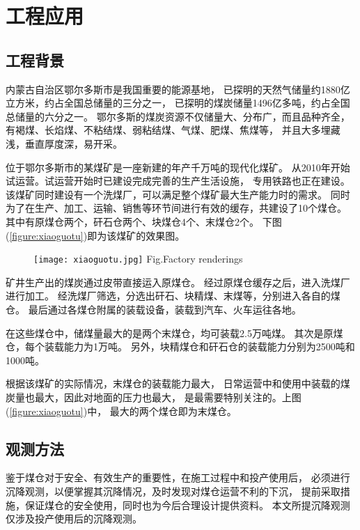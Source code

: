 
\chapter{工程应用}

\label{chap04}

\section{工程背景} 
内蒙古自治区鄂尔多斯市是我国重要的能源基地，
已探明的天然气储量约1880亿立方米，约占全国总储量的三分之一，
已探明的煤炭储量1496亿多吨，约占全国总储量的六分之一。
鄂尔多斯的煤炭资源不仅储量大、分布广，而且品种齐全，
有褐煤、长焰煤、不粘结煤、弱粘结煤、气煤、肥煤、焦煤等，
并且大多埋藏浅，垂直厚度深，易开采。

位于鄂尔多斯市的某煤矿是一座新建的年产千万吨的现代化煤矿。
从2010年开始试运营。试运营开始时已建设完成完善的生产生活设施，
专用铁路也正在建设。
该煤矿同时建设有一个洗煤厂，可以满足整个煤矿最大生产能力时的需求。
同时为了在生产、加工、运输、销售等环节间进行有效的缓存，共建设了10个煤仓。
其中有原煤仓两个，矸石仓两个、块煤仓4个、末煤仓2个。
下图(\ref{figure:xiaoguotu})即为该煤矿的效果图。
\begin{figure}[!htbp]
   \centering
   \texttt{[image: xiaoguotu.jpg]}
								{Fig.}{Factory renderings}
\end{figure}

矿井生产出的煤炭通过皮带直接运入原煤仓。
经过原煤仓缓存之后，进入洗煤厂进行加工。
经洗煤厂筛选，分选出矸石、块精煤、末煤等，分别进入各自的煤仓。
最后通过各煤仓附属的装载设备，装载到汽车、火车运往各地。

在这些煤仓中，储煤量最大的是两个末煤仓，均可装载2.5万吨煤。
其次是原煤仓，每个装载能力为1万吨。
另外，块精煤仓和矸石仓的装载能力分别为2500吨和1000吨。

根据该煤矿的实际情况，末煤仓的装载能力最大，
日常运营中和使用中装载的煤炭量也最大，因此对地面的压力也最大，
是最需要特别关注的。上图(\ref{figure:xiaoguotu})中，
最大的两个煤仓即为末煤仓。

\section{观测方法}
鉴于煤仓对于安全、有效生产的重要性，在施工过程中和投产使用后，
必须进行沉降观测，以便掌握其沉降情况，及时发现对煤仓运营不利的下沉，
提前采取措施，保证煤仓的安全使用，同时也为今后合理设计提供资料。
本文所提沉降观测仅涉及投产使用后的沉降观测。

